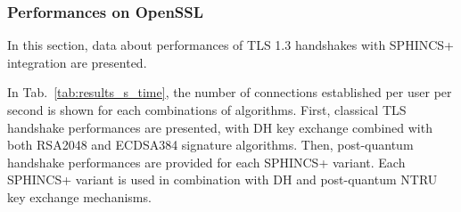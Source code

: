 \documentclass[a4paper,12pt]{article}
\def\mytab#1{Tab.~#1\xspace}
\begin{document}
\subsubsection{Performances on OpenSSL}
\label{subsub:perf_openssl}

In this section, data about performances of TLS 1.3 handshakes with SPHINCS+ integration are presented.

In \mytab{\ref{tab:results_s_time}}, the number of connections established per user per second is shown for each combinations of algorithms. First, classical TLS handshake performances are presented, with DH key exchange combined with both RSA2048 and ECDSA384 signature algorithms. Then, post-quantum handshake performances are provided for each SPHINCS+ variant. Each SPHINCS+ variant is used in combination with DH and post-quantum NTRU key exchange mechanisms. 
\end{document}

